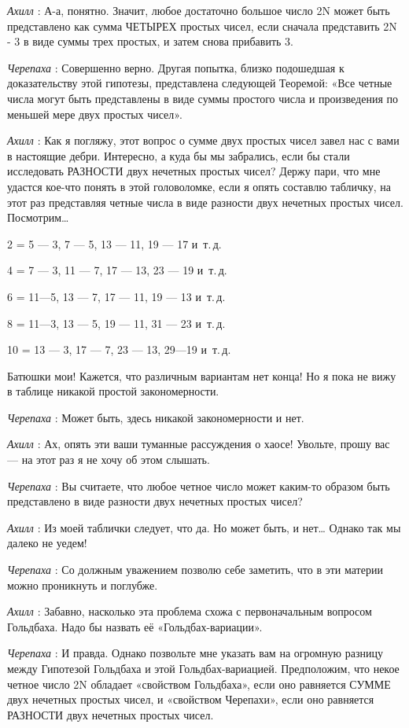\documentclass[../main.tex]{subfiles}
\begin{document}
\begin{dialogue}
\emph{Ахилл} : А-а, понятно. Значит, любое достаточно большое число 2N может быть представлено как сумма ЧЕТЫРЕХ простых чисел, если сначала представить 2N - 3 в виде суммы трех простых, и затем снова прибавить 3.

\emph{Черепаха} : Совершенно верно. Другая попытка, близко подошедшая к доказательству этой гипотезы, представлена следующей Теоремой: «Все четные числа могут быть представлены в виде суммы простого числа и произведения по меньшей мере двух простых чисел».

\emph{Ахилл} : Как я погляжу, этот вопрос о сумме двух простых чисел завел нас с вами в настоящие дебри. Интересно, а куда бы мы забрались, если бы стали исследовать РАЗНОСТИ двух нечетных простых чисел? Держу пари, что мне удастся кое-что понять в этой головоломке, если я опять составлю табличку, на этот раз представляя четные числа в виде разности двух нечетных простых чисел. Посмотрим\ldots{}

2 = 5 --- 3, 7 --- 5, 13 --- 11, 19 --- 17 и~т.\,д.

4 = 7 --- 3, 11 --- 7, 17 --- 13, 23 --- 19 и~т.\,д.

6 = 11---5, 13 --- 7, 17 --- 11, 19 --- 13 и~т.\,д.

8 = 11---3, 13 --- 5, 19 --- 11, 31 --- 23 и~т.\,д.

10 = 13 --- 3, 17 --- 7, 23 --- 13, 29---19 и~т.\,д.

Батюшки мои! Кажется, что различным вариантам нет конца! Но я пока не вижу в таблице никакой простой закономерности.

\emph{Черепаха} : Может быть, здесь никакой закономерности и нет.

\emph{Ахилл} : Ах, опять эти ваши туманные рассуждения о хаосе! Увольте, прошу вас --- на этот раз я не хочу об этом слышать.

\emph{Черепаха} : Вы считаете, что любое четное число может каким-то образом быть представлено в виде разности двух нечетных простых чисел?

\emph{Ахилл} : Из моей таблички следует, что да. Но может быть, и нет\ldots{} Однако так мы далеко не уедем!

\emph{Черепаха} : Со должным уважением позволю себе заметить, что в эти материи можно проникнуть и поглубже.

\emph{Ахилл} : Забавно, насколько эта проблема схожа с первоначальным вопросом Гольдбаха. Надо бы назвать её «Гольдбах-вариации».

\emph{Черепаха} : И правда. Однако позвольте мне указать вам на огромную разницу между Гипотезой Гольдбаха и этой Гольдбах-вариацией. Предположим, что некое четное число 2N обладает «свойством Гольдбаха», если оно равняется СУММЕ двух нечетных простых чисел, и «свойством Черепахи», если оно равняется РАЗНОСТИ двух нечетных простых чисел.


\end{dialogue}
\end{document}
